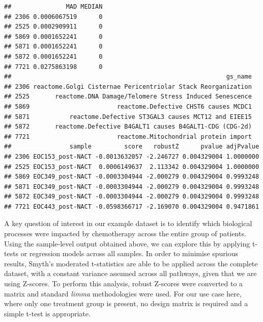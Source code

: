 \documentclass[9pt,a4paper,]{extarticle}
\begin{document}
\begin{verbatim}
##               MAD MEDIAN
## 2306 0.0006067519      0
## 2525 0.0002909911      0
## 5869 0.0001652241      0
## 5871 0.0001652241      0
## 5872 0.0001652241      0
## 7721 0.0275863198      0
##                                                           gs_name
## 2306 reactome.Golgi Cisternae Pericentriolar Stack Reorganization
## 2525       reactome.DNA Damage/Telomere Stress Induced Senescence
## 5869                        reactome.Defective CHST6 causes MCDC1
## 5871           reactome.Defective ST3GAL3 causes MCT12 and EIEE15
## 5872       reactome.Defective B4GALT1 causes B4GALT1-CDG (CDG-2d)
## 7721                        reactome.Mitochondrial protein import
##                sample         score   robustZ      pvalue adjPvalue
## 2306 EOC153_post-NACT -0.0013632057 -2.246727 0.004329004 1.0000000
## 2525 EOC153_post-NACT  0.0006149637  2.113342 0.004329004 1.0000000
## 5869 EOC349_post-NACT -0.0003304944 -2.000279 0.004329004 0.9993248
## 5871 EOC349_post-NACT -0.0003304944 -2.000279 0.004329004 0.9993248
## 5872 EOC349_post-NACT -0.0003304944 -2.000279 0.004329004 0.9993248
## 7721 EOC443_post-NACT -0.0598366717 -2.169070 0.004329004 0.9471861
\end{verbatim}

A key question of interest in our example dataset is to identify which biological processes were impacted by chemotherapy across the entire group of patients.
Using the sample-level output obtained above, we can explore this by applying t-tests or regression models across all samples.
In order to minimise spurious results, Smyth's moderated t-statistics\citep{Smyth_2004} are able to be applied across the complete dataset, with a constant variance assumed across all pathways, given that we are using Z-scores.
To perform this analysis, robust Z-scores were converted to a matrix and standard \emph{limma} methodologies were used.
For our use case here, where only one treatment group is present, no design matrix is required and a simple t-test is appropriate.
\end{document}
